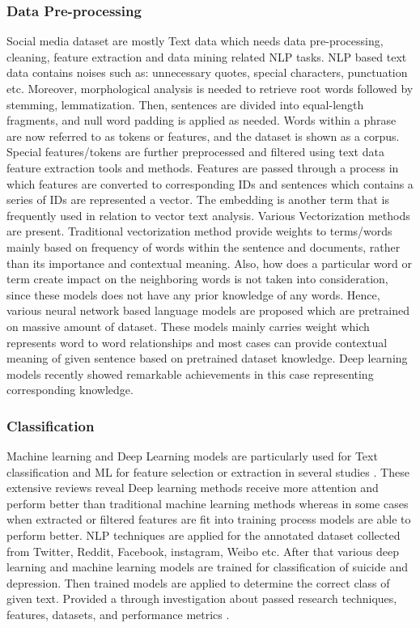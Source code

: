 \documentclass[sn-mathphys,Numbered]{sn-jnl}%
\theoremstyle{thmstyleone}%
\theoremstyle{thmstyletwo}%
\theoremstyle{thmstylethree}%
\begin{document}
\subsubsection{Data Pre-processing}\label{data_preprocessing}
Social media dataset are mostly Text data which needs data pre-processing, cleaning, feature extraction and data mining related NLP tasks. NLP based text data contains noises such as: unnecessary quotes, special characters, punctuation etc. Moreover, morphological analysis is needed to retrieve root words followed by stemming, lemmatization. Then, sentences are divided into equal-length fragments, and null word padding is applied as needed. Words within a phrase are now referred to as tokens or features, and the dataset is shown as a corpus. Special features/tokens are further preprocessed and filtered using text data feature extraction tools and methods. Features are passed through a process in which features are converted to corresponding IDs and sentences which contains a series of IDs are represented a vector. The embedding is another term that is frequently used in relation to vector text analysis. Various Vectorization methods are present. Traditional vectorization method provide weights to terms/words mainly based on frequency of words within the sentence and documents, rather than its importance and contextual meaning. Also, how does a particular word or term create impact on the neighboring words is not taken into consideration, since these models does not have any prior knowledge of any words. Hence, various neural network based language models are proposed which are pretrained on massive amount of dataset. These models mainly carries weight which represents word to word relationships and most cases can provide contextual meaning of given sentence based on pretrained dataset knowledge. Deep learning models recently showed remarkable achievements in this case representing corresponding knowledge.

\subsubsection{Classification}
Machine learning and Deep Learning models are particularly used for Text classification and ML for feature selection or extraction in several studies \cite{castillo2020suicide, chancellor2020methods, zhang2022natural}. These extensive reviews reveal Deep learning methods receive more attention and perform better than traditional machine learning methods whereas in some cases when extracted or filtered features are fit into training process models are able to perform better. NLP techniques are applied for the annotated dataset collected from Twitter, Reddit, Facebook, instagram, Weibo \cite{wang2020depression} etc. After that various deep learning and machine learning models are trained for classification of suicide and depression. Then trained models are applied to determine the correct class of given text. \cite{malhotra2022deep} Provided a through investigation about passed research techniques, features, datasets, and performance metrics \cite{zhang2022natural, chancellor2020methods}. 
\end{document}
